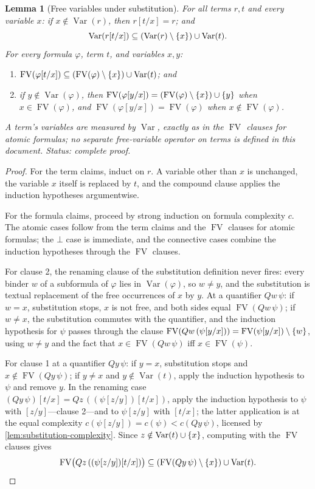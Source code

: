 \documentclass[11pt,oneside,openany]{book}
\theoremstyle{definition}
\theoremstyle{plain}
\newtheorem{lemma}[definition]{Lemma}
\theoremstyle{remark}
\DeclarePairedDelimiter{\set}{\lbrace}{\rbrace}
\newcommand{\FV}{\operatorname{FV}}
\newcommand{\bottom}{\bot}
\begin{document}
\begin{lemma}[Free variables under substitution]
\label{lem:substitution-fv}
For all terms \(r,t\) and every variable \(x\): if
\(x\notin\operatorname{Var}(r)\), then \(r[t/x]=r\); and
\[
 \operatorname{Var}(r[t/x])\subseteq
 (\operatorname{Var}(r)\setminus\set{x})\cup\operatorname{Var}(t).
\]
For every formula \(\varphi\), term \(t\), and variables \(x,y\):
\begin{enumerate}
  \item \(\FV(\varphi[t/x])\subseteq
        (\FV(\varphi)\setminus\set{x})\cup\operatorname{Var}(t)\); and
  \item if \(y\notin\operatorname{Var}(\varphi)\), then
        \(\FV(\varphi[y/x])=(\FV(\varphi)\setminus\set{x})\cup\set{y}\)
        when \(x\in\FV(\varphi)\), and
        \(\FV(\varphi[y/x])=\FV(\varphi)\) when
        \(x\notin\FV(\varphi)\).
\end{enumerate}
A term's variables are measured by \(\operatorname{Var}\), exactly as in
the \(\FV\) clauses for atomic formulas; no separate free-variable
operator on terms is defined in this document.
\textit{Status: complete proof.}
\end{lemma}
\begin{proof}
For the term claims, induct on \(r\).  A variable other than \(x\) is
unchanged, the variable \(x\) itself is replaced by \(t\), and the compound
clause applies the induction hypotheses argumentwise.

For the formula claims, proceed by strong induction on formula complexity
\(c\).  The atomic cases follow from the term claims and the \(\FV\)
clauses for atomic formulas; the \(\bottom\) case is immediate, and the
connective cases combine the induction hypotheses through the \(\FV\)
clauses.

For clause 2, the renaming clause of the substitution definition never
fires: every binder \(w\) of a subformula of \(\varphi\) lies in
\(\operatorname{Var}(\varphi)\), so \(w\ne y\), and the substitution is
textual replacement of the free occurrences of \(x\) by \(y\).  At a
quantifier \(Qw\,\psi\): if \(w=x\), substitution stops, \(x\) is not free,
and both sides equal \(\FV(Qw\,\psi)\); if \(w\ne x\), the substitution
commutes with the quantifier, and the induction hypothesis for \(\psi\)
passes through the clause
\(\FV(Qw\,(\psi[y/x]))=\FV(\psi[y/x])\setminus\set{w}\), using
\(w\ne y\) and the fact that \(x\in\FV(Qw\,\psi)\) iff
\(x\in\FV(\psi)\).

For clause 1 at a quantifier \(Qy\,\psi\): if \(y=x\), substitution stops
and \(x\notin\FV(Qy\,\psi)\); if \(y\ne x\) and
\(y\notin\operatorname{Var}(t)\), apply the induction hypothesis to
\(\psi\) and remove \(y\).  In the renaming case
\((Qy\,\psi)[t/x]=Qz\,((\psi[z/y])[t/x])\), apply the induction hypothesis
to \(\psi\) with \([z/y]\)---clause 2---and to \(\psi[z/y]\) with
\([t/x]\); the latter application is at the equal complexity
\(c(\psi[z/y])=c(\psi)<c(Qy\,\psi)\), licensed by
\cref{lem:substitution-complexity}.  Since
\(z\notin\operatorname{Var}(t)\cup\set{x}\), computing with the \(\FV\)
clauses gives
\[
 \FV\bigl(Qz\,((\psi[z/y])[t/x])\bigr)\subseteq
 (\FV(Qy\,\psi)\setminus\set{x})\cup\operatorname{Var}(t).
 \qedhere
\]
\end{proof}
\end{document}
